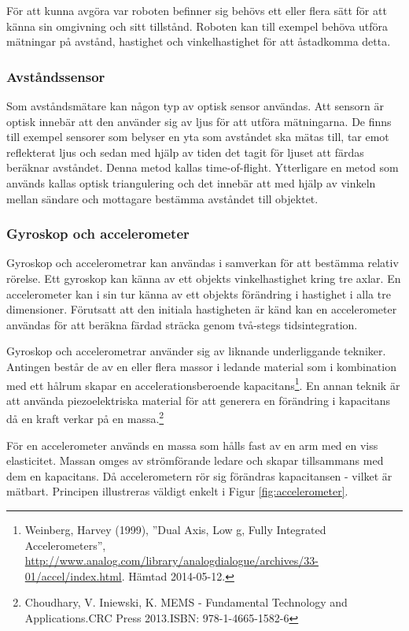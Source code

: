 \documentclass[a4paper,12pt,fleqn]{article}
\begin{document}
För att kunna avgöra var roboten befinner sig behövs ett eller flera sätt för att känna sin omgivning och sitt tillstånd. Roboten kan till exempel behöva utföra mätningar på avstånd, hastighet och vinkelhastighet för att åstadkomma detta. 

\subsubsection{Avståndssensor}

Som avståndsmätare kan någon typ av optisk sensor användas. Att sensorn är optisk innebär att den använder sig av ljus för att utföra mätningarna. De finns till exempel sensorer som belyser en yta som avståndet ska mätas till, tar emot reflekterat ljus och sedan med hjälp av tiden det tagit för ljuset att färdas beräknar avståndet. Denna metod kallas time-of-flight. Ytterligare en metod som används kallas optisk triangulering och det innebär att med hjälp av vinkeln mellan sändare och mottagare bestämma avståndet till objektet.
\newpage

\subsubsection{Gyroskop och accelerometer}

Gyroskop och accelerometrar kan användas i samverkan för att bestämma relativ rörelse. Ett gyroskop kan känna av ett objekts vinkelhastighet kring tre axlar. En accelerometer kan i sin tur känna av ett objekts förändring i hastighet i alla tre dimensioner. Förutsatt att den initiala hastigheten är känd kan en accelerometer användas för att beräkna färdad sträcka genom två-stegs tidsintegration. 

Gyroskop och accelerometrar använder sig av liknande underliggande tekniker. Antingen består de av en eller flera massor i ledande material som i kombination med ett hålrum skapar en accelerationsberoende kapacitans\footnote{Weinberg, Harvey (1999), ''Dual Axis, Low g, Fully Integrated Accelerometers'', \url{http://www.analog.com/library/analogdialogue/archives/33-01/accel/index.html}. Hämtad 2014-05-12.}. En annan teknik är att använda piezoelektriska material för att generera en förändring i kapacitans då en kraft verkar på en massa.\footnote{Choudhary, V. Iniewski, K. MEMS - Fundamental Technology and Applications.CRC Press 2013.ISBN: 978-1-4665-1582-6} 

För en accelerometer används en massa som hålls fast av en arm med en viss elasticitet. Massan omges av strömförande ledare och skapar tillsammans med dem en kapacitans. Då accelerometern rör sig förändras kapacitansen - vilket är mätbart. Principen illustreras väldigt enkelt i Figur \ref{fig:accelerometer}.
\end{document}
